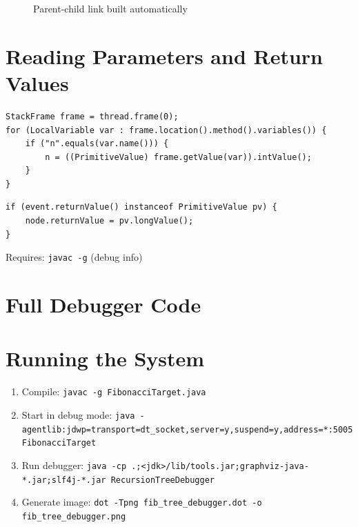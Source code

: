 \documentclass[11pt,a4paper]{article}
\begin{document}
    \begin{figure}[H]
        \centering
        \caption{Parent-child link built automatically}
    \end{figure}

    \section{Reading Parameters and Return Values}

    \begin{lstlisting}[caption={Reading local variable \texttt{n}}]
StackFrame frame = thread.frame(0);
for (LocalVariable var : frame.location().method().variables()) {
    if ("n".equals(var.name())) {
        n = ((PrimitiveValue) frame.getValue(var)).intValue();
    }
}
    \end{lstlisting}

    \begin{lstlisting}[caption={Capturing return value}]
if (event.returnValue() instanceof PrimitiveValue pv) {
    node.returnValue = pv.longValue();
}
    \end{lstlisting}

    Requires: \texttt{javac -g} (debug info)

    \section{Full Debugger Code}

    

    \section{Running the System}

    \begin{enumerate}
        \item Compile: \lstinline!javac -g FibonacciTarget.java!
        \item Start in debug mode:
        \lstinline!java -agentlib:jdwp=transport=dt_socket,server=y,suspend=y,address=*:5005 FibonacciTarget!
        \item Run debugger:
        \lstinline!java -cp .;<jdk>/lib/tools.jar;graphviz-java-*.jar;slf4j-*.jar RecursionTreeDebugger!
        \item Generate image:
        \lstinline!dot -Tpng fib_tree_debugger.dot -o fib_tree_debugger.png!
    \end{enumerate}
\end{document}
